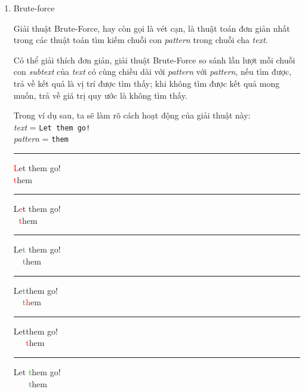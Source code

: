 \documentclass[a4paper,11pt]{article}
\begin{document}
	\begin{enumerate}
		\item Brute-force 
		
			Giải thuật Brute-Force, hay còn gọi là vét cạn, 
			là thuật toán đơn giản nhất trong các thuật toán 
			tìm kiếm chuỗi con \textit{pattern} 
			trong chuỗi cha \textit{text}.

			Có thể giải thích đơn giản, giải thuật Brute-Force 
			so sánh lần lượt mỗi chuỗi con \textit{subtext} của \textit{text} 
			có cùng chiều dài với \textit{pattern} với \textit{pattern}, 
			nếu tìm được, trả về kết quả là vị trí được tìm thấy; khi không 
			tìm được kết quả mong muốn, trả về giá trị quy ước là không tìm thấy.

			Trong ví dụ sau, ta sẽ làm rõ cách hoạt động của giải thuật này:\\
			\textit{text} \hspace*{7mm}= \verb|Let them go!| \\
			\textit{pattern} \hspace*{0.1mm} = \verb|them| 
			\vspace*{4mm}
			\hrule
			\textcolor{red}{L}et them go!\\
			\textcolor{red}{t}hem

			\vspace*{2mm}
			\hrule
			L\textcolor{red}{e}t them go!\\
			\textcolor{white}{L}\textcolor{red}{t}hem
			
			\vspace*{2mm}
			\hrule
			Le\textcolor{ForestGreen}{t} them go!\\
			\textcolor{white}{Le}\textcolor{ForestGreen}{t}hem
			
			\vspace*{2mm}
			\hrule
			Le\textcolor{ForestGreen}{t}\textcolor{red}{\textvisiblespace}them go!\\
			\textcolor{white}{Le}\textcolor{ForestGreen}{t}\textcolor{red}{h}em

			\vspace*{2mm}
			\hrule
			Let\textcolor{red}{\textvisiblespace}them go!\\
			\textcolor{white}{Let}\textcolor{red}{t}hem
			
			\vspace*{2mm}
			\hrule
			Let \textcolor{ForestGreen}{t}hem go!\\
			\textcolor{white}{Let }\textcolor{ForestGreen}{t}hem


\end{enumerate}
\end{document}
